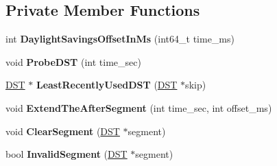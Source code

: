 \subsection*{Private Member Functions}
\begin{DoxyCompactItemize}
\item 
int {\bfseries Daylight\+Savings\+Offset\+In\+Ms} (int64\+\_\+t time\+\_\+ms)\hypertarget{classv8_1_1internal_1_1_date_cache_a4676b72c0273796ea3dc410c8aad8e72}{}\label{classv8_1_1internal_1_1_date_cache_a4676b72c0273796ea3dc410c8aad8e72}

\item 
void {\bfseries Probe\+D\+ST} (int time\+\_\+sec)\hypertarget{classv8_1_1internal_1_1_date_cache_aa5598d04bf9ce4d1b0e689200def9ea7}{}\label{classv8_1_1internal_1_1_date_cache_aa5598d04bf9ce4d1b0e689200def9ea7}

\item 
\hyperlink{structv8_1_1internal_1_1_date_cache_1_1_d_s_t}{D\+ST} $\ast$ {\bfseries Least\+Recently\+Used\+D\+ST} (\hyperlink{structv8_1_1internal_1_1_date_cache_1_1_d_s_t}{D\+ST} $\ast$skip)\hypertarget{classv8_1_1internal_1_1_date_cache_a27e14d40184d224f2e43d6046d793ce1}{}\label{classv8_1_1internal_1_1_date_cache_a27e14d40184d224f2e43d6046d793ce1}

\item 
void {\bfseries Extend\+The\+After\+Segment} (int time\+\_\+sec, int offset\+\_\+ms)\hypertarget{classv8_1_1internal_1_1_date_cache_a0ef487479555a5c645d503c07de010d5}{}\label{classv8_1_1internal_1_1_date_cache_a0ef487479555a5c645d503c07de010d5}

\item 
void {\bfseries Clear\+Segment} (\hyperlink{structv8_1_1internal_1_1_date_cache_1_1_d_s_t}{D\+ST} $\ast$segment)\hypertarget{classv8_1_1internal_1_1_date_cache_ad01b80bdbc2085486893714fb6b2c3ab}{}\label{classv8_1_1internal_1_1_date_cache_ad01b80bdbc2085486893714fb6b2c3ab}

\item 
bool {\bfseries Invalid\+Segment} (\hyperlink{structv8_1_1internal_1_1_date_cache_1_1_d_s_t}{D\+ST} $\ast$segment)\hypertarget{classv8_1_1internal_1_1_date_cache_a6ce44e840f900cafff0a77f920a2acaa}{}\label{classv8_1_1internal_1_1_date_cache_a6ce44e840f900cafff0a77f920a2acaa}

\end{DoxyCompactItemize}
